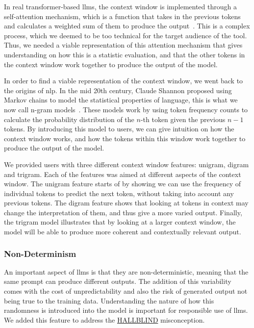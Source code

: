 In real transformer-based \gls{llms}, the context window is implemented through a self-attention mechanism, which is a function that takes in the previous tokens and calculates a weighted sum of them to produce the output~\cite{vaswani_attention_2017}. This is a complex process, which we deemed to be too technical for the target audience of the tool. Thus, we needed a viable representation of this attention mechanism that gives understanding on how this is a statistic evaluation, and that the other tokens in the context window work together to produce the output of the model.

In order to find a viable representation of the context window, we went back to the origins of \gls{nlp}. In the mid 20th century, Claude Shannon proposed using Markov chains to model the statistical properties of language, this is what we now call n-gram models~\cite{ghaseminejad_raeini_evolution_2025}. These models work by using token frequency counts to calculate the probability distribution of the $n$-th token given the previous $n-1$ tokens. By introducing this model to users, we can give intuition on how the context window works, and how the tokens within this window work together to produce the output of the model. 

We provided users with three different context window features: unigram, digram and trigram. Each of the features was aimed at different aspects of the context window. The unigram feature starts of by showing we can use the frequency of individual tokens to predict the next token, without taking into account any previous tokens. The digram feature shows that looking at tokens in context may change the interpretation of them, and thus give a more varied output. Finally, the trigram model illustrates that by looking at a larger context window, the model will be able to produce more coherent and contextually relevant output.

\subsubsection*{Non-Determinism}
An important aspect of \gls{llms} is that they are non-deterministic, meaning that the same prompt can produce different outputs. The addition of this variability comes with the cost of unpredictability and also the risk of generated output not being true to the training data. Understanding the nature of how this randomness is introduced into the model is important for responsible use of \gls{llms}. We added this feature to address  the \hyperref[hallblind]{HALLBLIND} misconception.

